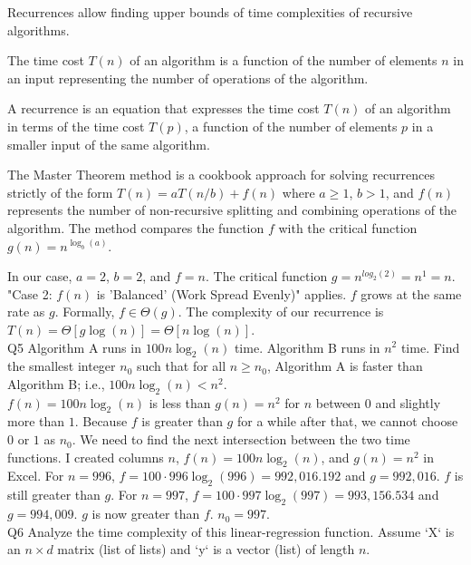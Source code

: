 \documentclass{article}
\begin{document}
Recurrences allow finding upper bounds of time complexities of recursive algorithms.

The time cost $T(n)$ of an algorithm is a function of the number of elements $n$ in an input representing the number of operations of the algorithm.

A recurrence is an equation that expresses the time cost $T(n)$ of an algorithm in terms of the time cost $T(p)$, a function of the number of elements $p$ in a smaller input of the same algorithm.

The Master Theorem method is a cookbook approach for solving recurrences strictly of the form $T(n) = a T(n/b) + f(n)$ where $a \geq 1$, $b > 1$, and $f(n)$ represents the number of non-recursive splitting and combining operations of the algorithm. The method compares the function $f$ with the critical function $g(n)=n^{\log_b(a)}$.

In our case, $a = 2$, $b = 2$, and $f = n$. The critical function $g = n^{log_2(2)} = n^1 = n$. "Case 2: $f(n)$ is 'Balanced' (Work Spread Evenly)" applies. $f$ grows at the same rate as $g$. Formally, $f \in \Theta(g)$. The complexity of our recurrence is $T(n) = \Theta[g \log(n)] = \Theta[n \log(n)]$.\\

Q5 Algorithm A runs in $100 n \log_2(n)$ time. Algorithm B runs in $n^2$ time. Find the smallest integer $n_0$ such that for all $n \geq n_0$, Algorithm A is faster than Algorithm B; i.e., $100 n \log_2(n) < n^2$.\\

$f(n) = 100 n \log_2(n)$ is less than $g(n) = n^2$ for $n$ between $0$ and slightly more than $1$. Because $f$ is greater than $g$ for a while after that, we cannot choose $0$ or $1$ as $n_0$. We need to find the next intersection between the two time functions. I created columns $n$, $f(n) = 100 n \log_2(n)$, and $g(n) = n^2$ in Excel. For $n = 996$, $f = 100 \cdot 996 \log_2(996) = 992,016.192$ and $g = 992,016$. $f$ is still greater than $g$. For $n = 997$, $f = 100 \cdot 997 \log_2(997) = 993,156.534$ and $g = 994,009$. $g$ is now greater than $f$. $n_0 = 997$.\\

Q6 Analyze the time complexity of this linear-regression function. Assume ‘X‘ is an $n \times d$ matrix (list of lists) and ‘y‘ is a vector (list) of length $n$.
\end{document}

